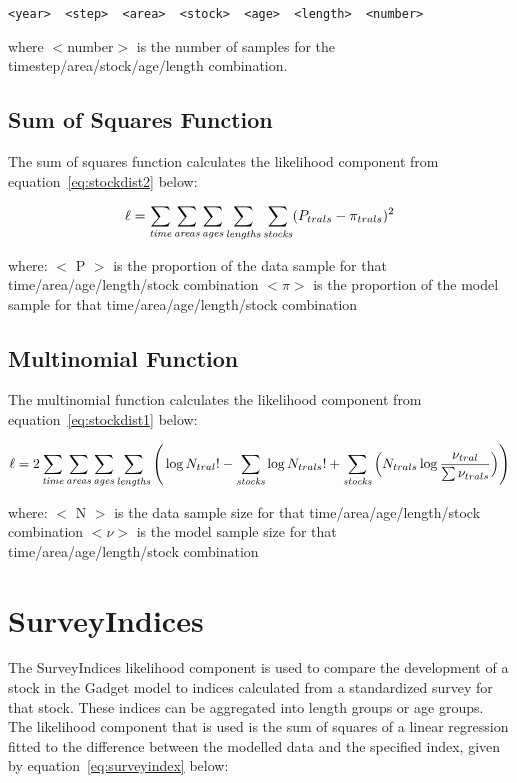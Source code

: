 \documentclass[10pt,twoside]{book}
\begin{document}
{\small\begin{verbatim}
<year>  <step>  <area>  <stock>  <age>  <length>  <number>
\end{verbatim}}

where $<$number$>$ is the number of samples for the timestep/area/stock/age/length combination.

\subsection{Sum of Squares Function}
The sum of squares function calculates the likelihood component from equation~\ref{eq:stockdist2} below:

\begin{equation}\label{eq:stockdist2}
\ell = \sum_{\it time}\sum_{\it areas}\sum_{\it ages}\sum_{\it lengths}\sum_{\it stocks} ( P_{trals} - \pi_{trals} ) ^2
\end{equation}

where:\newline
$<$ P $>$ is the proportion of the data sample for that time/area/age/length/stock combination\newline
$<\pi>$ is the proportion of the model sample for that time/area/age/length/stock combination

\subsection{Multinomial Function}
The multinomial function calculates the likelihood component from equation~\ref{eq:stockdist1} below:

\begin{equation}\label{eq:stockdist1}
\ell = 2 \sum_{\it time}\sum_{\it areas}\sum_{\it ages}\sum_{\it lengths} \Bigg( \log N_{tral}! - \sum_{\it stocks} \log N_{trals}! + \sum_{\it stocks} \Big( N_{trals} \log {\frac{\nu_{tral}}{\sum \nu_{trals}}} \Big)\Bigg)
\end{equation}

where:\newline
$<$ N $>$ is the data sample size for that time/area/age/length/stock combination\newline
$<\nu>$ is the model sample size for that time/area/age/length/stock combination

\section{SurveyIndices}\label{sec:surveyindices}
The SurveyIndices likelihood component is used to compare the development of a stock in the Gadget model to indices calculated from a standardized survey for that stock.  These indices can be aggregated into length groups or age groups.  The likelihood component that is used is the sum of squares of a linear regression fitted to the difference between the modelled data and the specified index, given by equation~\ref{eq:surveyindex} below:
\end{document}
